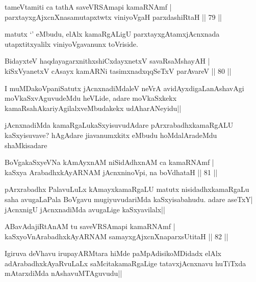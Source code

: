\begin{shl}
tameVtamiti ca tathA saveVRSAmapi kamaRNAmf |\\
parxtayxgAjxcnXnasamutapxtwtx viniyoVgaH parxdashiRtaH \hfill || 79 ||
\end{shl}

\begin{artha}
matutx `\stext' eMbudu, elAlx kamaRgALigU parxtayxgAtamxjAcnxnada utapxtitxyalilx viniyoVgavanunx toVriside.
\end{artha}

\begin{shl}
BidayxteV haqdayagarxnithxshiCxdayxnetxV savaRsaMshayAH |\\
kiSxVyanetxV cAsayx kamARNi tasimxnadxqqSeTxV parAvareV \hfill || 80 ||
\end{shl}

\begin{artha}
I muMDakoVpaniSatutx jAcnxnadiMdaleV neVrA avidAyxdigaLanAshavAgi moVkaSxvAguvudeMdu heVLide, adare moVkaSxkekx kamaRsahAkariyAgilalxveMbudakekx udAharANeyidu||
\end{artha}

\begin{artha}
jAcnxnadiMda kamaRgaLukaSxyisuvudAdare pArxrabadhxkamaRgALU kaSxyisuvave? hAgAdare jiavanumxkitx eMbudu hoMdalAradeMdu shaMkisadare
\end{artha}


\begin{shl}
BoVgakaSxyeVNa kAmAyxnAM niSidAdhxnAM ca kamaRNAmf |\\
kaSxya ArabadhxkAyARNAM jAcnxninoV\s pi, na boVdhataH \hfill || 81 ||
\end{shl}

\begin{artha}
pArxrabadhx PalavuLuLx kAmayxkamaRgaLU matutx nisidadhxkamaRgaLu saha avugaLaPala BoVgavu mugiyuvudariMda kaSxyisabahudu. adare aseTxY| jAcnxnigU jAcnxnadiMda avugaLige kaSxyavilalx||
\end{artha}

\begin{shl}
ABavAdajiRtAnAM tu saveVRSAmapi kamaRNAmf |\\
kaSxyoV\s nArabadhxkAyARNAM samayxgAjxcnXnaparxsUtitaH \hfill || 82 ||
\end{shl}

\begin{artha}
Igiruva deVhavu irupayARMtara hiMde paMpAdisikoMDidadx elAlx adArabadhxkAyaRvuLaLx saMcitakamaRgaLige tatavxjAcnxnavu huTiTxda mAtarxdiMda nAshavuMTAguvudu||
\end{artha}

